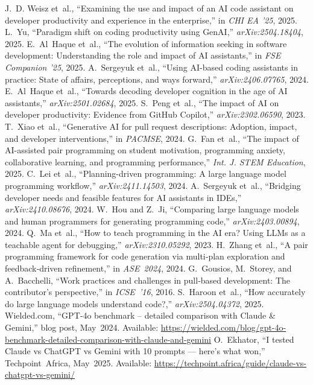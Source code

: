 \documentclass[conference]{IEEEtran}
\begin{document}
\begin{thebibliography}{99}
 J.~D. Weisz et~al., “Examining the use and impact of an AI code assistant on developer productivity and experience in the enterprise,” in \emph{CHI EA ’25}, 2025.
 L.~Yu, “Paradigm shift on coding productivity using GenAI,” \emph{arXiv:2504.18404}, 2025.
 E.~Al~Haque et~al., “The evolution of information seeking in software development: Understanding the role and impact of AI assistants,” in \emph{FSE Companion ’25}, 2025.
 A.~Sergeyuk et~al., “Using AI-based coding assistants in practice: State of affairs, perceptions, and ways forward,” \emph{arXiv:2406.07765}, 2024.
 E.~Al~Haque et~al., “Towards decoding developer cognition in the age of AI assistants,” \emph{arXiv:2501.02684}, 2025.
 S.~Peng et~al., “The impact of AI on developer productivity: Evidence from GitHub Copilot,” \emph{arXiv:2302.06590}, 2023.
 T.~Xiao et~al., “Generative AI for pull request descriptions: Adoption, impact, and developer interventions,” in \emph{PACMSE}, 2024.
 G.~Fan et~al., “The impact of AI-assisted pair programming on student motivation, programming anxiety, collaborative learning, and programming performance,” \emph{Int. J. STEM Education}, 2025.
 C.~Lei et~al., “Planning-driven programming: A large language model programming workflow,” \emph{arXiv:2411.14503}, 2024.
 A.~Sergeyuk et~al., “Bridging developer needs and feasible features for AI assistants in IDEs,” \emph{arXiv:2410.08676}, 2024.
 W.~Hou and Z.~Ji, “Comparing large language models and human programmers for generating programming code,” \emph{arXiv:2403.00894}, 2024.
 Q.~Ma et~al., “How to teach programming in the AI era? Using LLMs as a teachable agent for debugging,” \emph{arXiv:2310.05292}, 2023.
 H.~Zhang et al., “A pair programming framework for code generation via multi‑plan exploration and feedback‑driven refinement,” in \emph{ASE 2024}, 2024.
 G.~Gousios, M.~Storey, and A.~Bacchelli, “Work practices and challenges in pull‑based development: The contributor’s perspective,” in \emph{ICSE ’16}, 2016.
 S.~Haroon et~al., “How accurately do large language models understand code?,” \emph{arXiv:2504.04372}, 2025.
 Wielded.com, “GPT‑4o benchmark – detailed comparison with Claude & Gemini,” blog post, May 2024.  Available: \url{https://wielded.com/blog/gpt-4o-benchmark-detailed-comparison-with-claude-and-gemini}
 O.~Ekhator, “I tested Claude vs ChatGPT vs Gemini with 10 prompts — here’s what won,” Techpoint Africa, May 2025.  Available: \url{https://techpoint.africa/guide/claude-vs-chatgpt-vs-gemini/}
\end{thebibliography}
\end{document}
